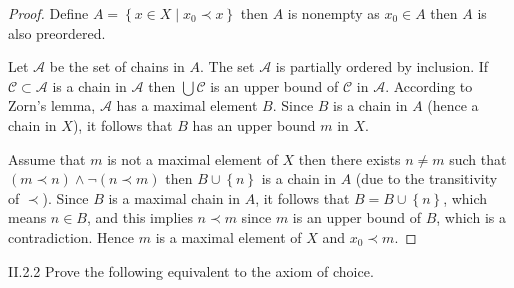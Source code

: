 \begin{proof}
	Define \( A = \left\{ x \in X \mid x_{0} \prec x \right\} \) then \( A \) is nonempty as \( x_{0} \in A \) then \( A \) is also preordered.

    Let \( \mathscr{A} \) be the set of chains in \( A \). The set \( \mathscr{A} \) is partially ordered by inclusion. If \( \mathscr{C} \subset \mathscr{A} \) is a chain in \( \mathscr{A} \) then \( \bigcup \mathscr{C} \) is an upper bound of \( \mathscr{C} \) in \( \mathscr{A} \). According to Zorn's lemma, \( \mathscr{A} \) has a maximal element \( B \). Since \( B \) is a chain in \( A \) (hence a chain in \(X\)), it follows that \( B \) has an upper bound \( m \) in \( X \).

    Assume that \(m\) is not a maximal element of \(X\) then there exists \( n \ne m \) such that \( (m \prec n) \land \neg (n \prec m) \) then \( B \cup \left\{ n \right\} \) is a chain in \( A \) (due to the transitivity of \(\prec\)). Since \( B \) is a maximal chain in \(A\), it follows that \( B = B \cup \left\{ n \right\} \), which means \( n \in B \), and this implies \( n \prec m \) since \(m\) is an upper bound of \(B\), which is a contradiction. Hence \(m\) is a maximal element of \(X\) and \( x_{0} \prec m \).
\end{proof}

\begin{problem}{II.2.2}\label{problem:II.2.2}
Prove the following equivalent to the axiom of choice.
\end{problem}

